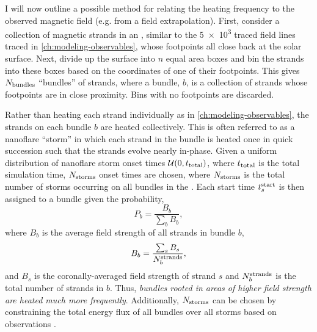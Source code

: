 I will now outline a possible method for relating the heating frequency to the observed magnetic field (e.g. from a field extrapolation). First, consider a collection of magnetic strands in an \AR{}, similar to the \num{5e3} traced field lines traced in \autoref{ch:modeling-observables}, whose footpoints all close back at the solar surface. Next, divide up the surface into $n$ equal area boxes and bin the strands into these boxes based on the coordinates of one of their footpoints. This gives $N_\textup{bundles}$ ``bundles'' of strands, where a bundle, $b$, is a collection of strands whose footpoints are in close proximity. Bins with no footpoints are discarded.

Rather than heating each strand individually as in \autoref{ch:modeling-observables}, the strands on each bundle $b$ are heated collectively. This is often referred to as a nanoflare ``storm'' in which each strand in the bundle is heated once in quick succession \citep{klimchuk_key_2015,schmelz_what_2015,mulu-moore_can_2011} such that the strands evolve nearly in-phase. Given a uniform distribution of nanoflare storm onset times $\mathcal{U}(0,t_\textup{total})$, where $t_\textup{total}$ is the total simulation time, $N_\textup{storms}$ onset times are chosen, where $N_\textup{storms}$ is the total number of storms occurring on all bundles in the \AR{}. Each start time $t_s^\textup{start}$ is then assigned to a bundle given the probability,
\begin{equation}
    P_b = \frac{B_b}{\sum_b B_b},
\end{equation}
where $B_b$ is the average field strength of all strands in bundle $b$,
\begin{equation}
    B_b = \frac{\sum_s B_s}{N^\textup{strands}_b},
\end{equation}
and $B_s$ is the coronally-averaged field strength of strand $s$ and $N^\textup{strands}_b$ is the total number of strands in $b$. Thus, \textit{bundles rooted in areas of higher field strength are heated much more frequently}. Additionally, $N_\textup{storms}$ can be chosen by constraining the total energy flux of all bundles over all storms based on observations \citep[e.g. \SI{e7}{\erg\per\square\cm\per\second} from][as in \autoref{sec:modeling-observables:heating}]{withbroe_mass_1977}.

